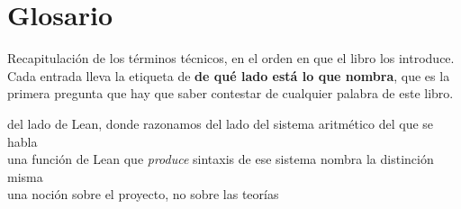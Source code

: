 \chapter{Glosario}
\label{ap:glosario}

Recapitulación de los términos técnicos, en el orden en que el libro los introduce. Cada entrada
lleva la etiqueta de \textbf{de qué lado está lo que nombra}, que es la primera pregunta que hay que
saber contestar de cualquier palabra de este libro.

\begin{center}\footnotesize
{} del lado de Lean, donde razonamos\quad
{} del lado del sistema aritmético del que se habla\\[0.35em]
 una función de Lean que \emph{produce} sintaxis de ese sistema\quad
{} nombra la distinción misma\\[0.35em]
 una noción sobre el proyecto, no sobre las teorías
\end{center}


